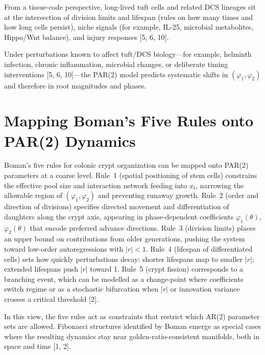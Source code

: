 \documentclass[]{interact}
\begin{document}
From a tissue-code perspective, long-lived tuft cells and related DCS lineages
sit at the intersection of division limits and lifespan (rules on how many
times and how long cells persist), niche signals (for example, IL-25, microbial
metabolites, Hippo/Wnt balance), and injury responses [5, 6, 10].

Under perturbations known to affect tuft/DCS biology---for example, helminth
infection, chronic inflammation, microbial changes, or deliberate timing
interventions [5, 6, 10]---the PAR(2) model predicts systematic shifts in
$(\varphi_1, \varphi_2)$ and therefore in root magnitudes and phases.

\section{Mapping Boman's Five Rules onto PAR(2) Dynamics}

Boman's five rules for colonic crypt organization can be mapped onto PAR(2)
parameters at a coarse level.
Rule~1 (spatial positioning of stem cells) constrains the effective pool size
and interaction network feeding into $x_t$, narrowing the allowable region of
$(\varphi_1, \varphi_2)$ and preventing runaway growth.
Rule~2 (order and direction of divisions) specifies directed movement and
differentiation of daughters along the crypt axis, appearing in
phase-dependent coefficients $\varphi_1(\theta)$, $\varphi_2(\theta)$ that
encode preferred advance directions.
Rule~3 (division limits) places an upper bound on contributions from older
generations, pushing the system toward low-order autoregressions with
$|r| < 1$.
Rule~4 (lifespan of differentiated cells) sets how quickly perturbations
decay: shorter lifespans map to smaller $|r|$; extended lifespans push $|r|$
toward 1.
Rule~5 (crypt fission) corresponds to a branching event, which can be modelled
as a change-point where coefficients switch regime or as a stochastic
bifurcation when $|r|$ or innovation variance crosses a critical
threshold [2].

In this view, the five rules act as constraints that restrict which AR(2)
parameter sets are allowed.
Fibonacci structures identified by Boman emerge as special cases where the
resulting dynamics stay near golden-ratio-consistent manifolds, both in space
and time [1, 2].
\end{document}
